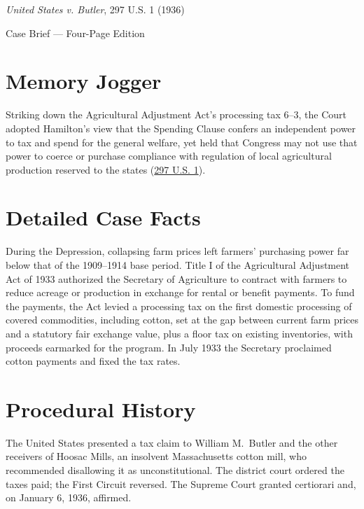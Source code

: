 \documentclass[12pt]{article}
\begin{document}
\begin{center}
{\LARGE \textit{United States v. Butler}, 297 U.S. 1 (1936)\par}
\vspace{0.8em}
{\large Case Brief --- Four-Page Edition\par}
\end{center}
\vspace{1em}

\section{Memory Jogger}

Striking down the Agricultural Adjustment Act's processing tax 6--3, the Court adopted Hamilton's view that the Spending Clause confers an independent power to tax and spend for the general welfare, yet held that Congress may not use that power to coerce or purchase compliance with regulation of local agricultural production reserved to the states (\href{https://supreme.justia.com/cases/federal/us/297/1/}{297 U.S. 1}).

\section{Detailed Case Facts}

During the Depression, collapsing farm prices left farmers' purchasing power far below that of the 1909--1914 base period. Title I of the Agricultural Adjustment Act of 1933 authorized the Secretary of Agriculture to contract with farmers to reduce acreage or production in exchange for rental or benefit payments. To fund the payments, the Act levied a processing tax on the first domestic processing of covered commodities, including cotton, set at the gap between current farm prices and a statutory fair exchange value, plus a floor tax on existing inventories, with proceeds earmarked for the program. In July 1933 the Secretary proclaimed cotton payments and fixed the tax rates.

\section{Procedural History}

The United States presented a tax claim to William M.\ Butler and the other receivers of Hoosac Mills, an insolvent Massachusetts cotton mill, who recommended disallowing it as unconstitutional. The district court ordered the taxes paid; the First Circuit reversed. The Supreme Court granted certiorari and, on January 6, 1936, affirmed.
\end{document}
